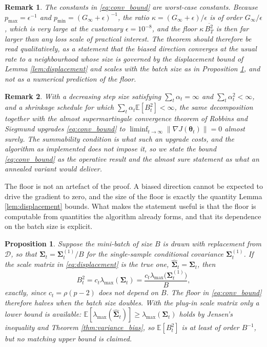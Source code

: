 \documentclass[pdflatex,sn-mathphys-num]{sn-jnl}%
\theoremstyle{thmstyleone}%
\newtheorem{proposition}[theorem]{Proposition}%
\theoremstyle{thmstyletwo}%
\newtheorem{remark}{Remark}%
\theoremstyle{thmstylethree}%
\newcommand{\rev}[1]{{\color{blue}#1}}
\newenvironment{revblock}{\color{blue}}{}
\newcommand{\E}{\mathbb{E}}
\begin{document}
\begin{revblock}
\begin{remark}
\label{rem:constants}
The constants in \eqref{eq:conv_bound} are worst-case constants. Because $p_{\max}=\epsilon^{-1}$ and $p_{\min}=(G_\infty+\epsilon)^{-1}$, the ratio $\kappa=(G_\infty+\epsilon)/\epsilon$ is of order $G_\infty/\epsilon$, which is very large at the customary $\epsilon=10^{-8}$, and the floor $\kappa\,\overline{B^2_T}$ is then far larger than any loss scale of practical interest. The theorem should therefore be read qualitatively, as a statement that the biased direction converges at the usual rate to a neighbourhood whose size is governed by the displacement bound of Lemma \ref{lem:displacement} and scales with the batch size as in Proposition \ref{prop:batch}, and not as a numerical prediction of the floor.
\end{remark}
\end{revblock}

\begin{remark}
With a decreasing step size satisfying $\sum_t\alpha_t=\infty$ and $\sum_t\alpha^2_t<\infty$, and a shrinkage schedule for which $\sum_t\alpha_t\E[B^2_t]<\infty$, the same decomposition together with the almost supermartingale convergence theorem of Robbins and Siegmund \cite{robbins1971} upgrades \eqref{eq:conv_bound} to $\liminf_{t\to\infty}\|\nabla J(\bm\theta_t)\|=0$ almost surely. The summability condition is what such an upgrade costs, and the algorithm as implemented does not impose it, so we state the bound \eqref{eq:conv_bound} as the operative result and the almost sure statement as what an annealed variant would deliver.
\end{remark}

The floor is not an artefact of the proof. A biased direction cannot be expected to drive the gradient to zero, and the size of the floor is exactly the quantity Lemma \ref{lem:displacement} bounds. What makes the statement useful is that the floor is computable from quantities the algorithm already forms, and that its dependence on the batch size is explicit.

\begin{proposition}
\label{prop:batch}
Suppose the mini-batch of size $B$ is drawn with replacement from $\mathcal D$, so that $\bm\Sigma_t=\bm\Sigma^{(1)}_t/B$ for the single-sample conditional covariance $\bm\Sigma^{(1)}_t$. If the scale matrix in \eqref{eq:displacement} is the true one, $\widehat{\bm\Sigma}_t=\bm\Sigma_t$, then
\begin{equation}
B^2_t=c_t\lambda_{\max}(\bm\Sigma_t)=\frac{c_t\lambda_{\max}\bigl(\bm\Sigma^{(1)}_t\bigr)}{B},
\end{equation}
exactly, since $c_t=\rho(p-2)$ does not depend on $B$. The floor in \eqref{eq:conv_bound} therefore halves when the batch size doubles. With the plug-in scale matrix \rev{only a lower bound is available: $\E[\lambda_{\max}(\widehat{\bm\Sigma}_t)]\ge\lambda_{\max}(\bm\Sigma_t)$ holds by Jensen's inequality and Theorem \ref{thm:variance_bias}, so $\E[B^2_t]$ is at least of order $B^{-1}$, but no matching upper bound is claimed.}
\end{proposition}
\end{document}
